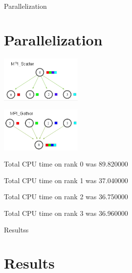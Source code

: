 \documentclass{beamer}
\begin{document}
\begin{frame}[allowframebreaks]{Parallelization}
\section{Parallelization}


\includegraphics[width=4cm]{mpi_scatter}

\framebreak



\includegraphics[width=4cm]{mpi_gather}

\framebreak

Total CPU time on rank 0 was 89.820000

Total CPU time on rank 1 was 37.040000

Total CPU time on rank 2 was 36.750000

Total CPU time on rank 3 was 36.960000

\end{frame}

\begin{frame}[allowframebreaks]{Resultss}
\section{Results}
\end{frame}
\end{document}
